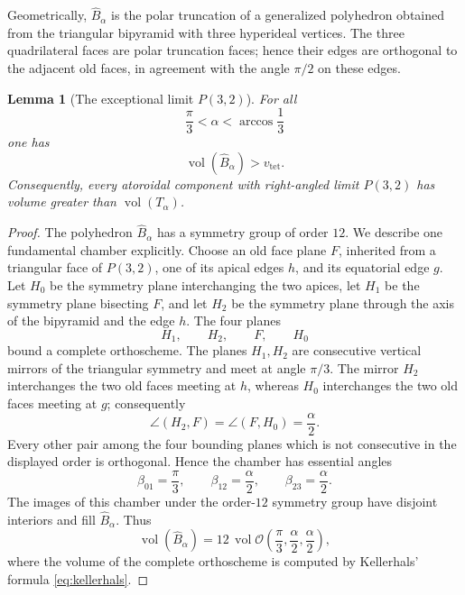 \documentclass[12pt,a4paper]{article}
\newtheorem{lemma}[theorem]{Lemma}
\theoremstyle{definition}
\DeclareMathOperator{\Vol}{vol}
\newcommand{\vtet}{v_{\mathrm{tet}}}
\begin{document}
Geometrically, \(\widehat B_\alpha\) is the polar truncation of a generalized polyhedron obtained from the triangular bipyramid with three hyperideal vertices. The three quadrilateral faces are polar truncation faces; hence their edges are orthogonal to the adjacent old faces, in agreement with the angle \(\pi/2\) on these edges.

\begin{lemma}[The exceptional limit \(P(3,2)\)]\label{lem:Bhat-volume}
For all
\[
        \frac{\pi}{3}<\alpha<\arccos\frac13
\]
one has
\[
        \Vol(\widehat B_\alpha)>\vtet.
\]
Consequently, every atoroidal component with right-angled limit \(P(3,2)\) has volume greater than \(\Vol(T_\alpha)\).
\end{lemma}

\begin{proof}
The polyhedron \(\widehat B_\alpha\) has a symmetry group of order \(12\).
We describe one fundamental chamber explicitly.  Choose an old face plane
\(F\), inherited from a triangular face of \(P(3,2)\), one of its apical
edges \(h\), and its equatorial edge \(g\).
Let \(H_0\) be the symmetry plane interchanging the two apices, let \(H_1\)
be the symmetry plane bisecting \(F\), and let \(H_2\) be the symmetry plane
through the axis of the bipyramid and the edge \(h\).  The four planes
\[
        H_1,\qquad H_2,\qquad F,\qquad H_0
\]
bound a complete orthoscheme.  The planes \(H_1,H_2\) are consecutive
vertical mirrors of the triangular symmetry and meet at angle \(\pi/3\).
The mirror \(H_2\) interchanges the two old faces meeting at \(h\), whereas
\(H_0\) interchanges the two old faces meeting at \(g\); consequently
\[
        \angle(H_2,F)=\angle(F,H_0)=\frac{\alpha}{2}.
\]
Every other pair among the four bounding planes which is not consecutive in
the displayed order is orthogonal.  Hence the chamber has essential angles
\begin{equation}\label{eq:Bhat-orthoscheme-angles}
        \beta_{01}=\frac{\pi}{3},\qquad
        \beta_{12}=\frac{\alpha}{2},\qquad
        \beta_{23}=\frac{\alpha}{2}.
\end{equation}
The images of this chamber under the order-\(12\) symmetry group have
disjoint interiors and fill \(\widehat B_\alpha\).  Thus
\begin{equation}\label{eq:Bhat-volume-orthoscheme}
        \Vol(\widehat B_\alpha)=
        12\,\Vol\mathcal O\left(\frac{\pi}{3},\frac{\alpha}{2},\frac{\alpha}{2}\right),
\end{equation}
where the volume of the complete orthoscheme is computed by Kellerhals' formula \eqref{eq:kellerhals}.


\end{proof}
\end{document}
